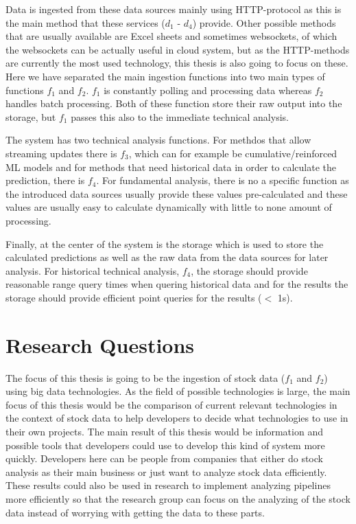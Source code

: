\documentclass[article,11pt]{article}
\begin{document}
Data is ingested from these data sources mainly using HTTP-protocol as this is the main method that these services ($d_1$ - $d_4$) provide.
Other possible methods that are usually available are Excel sheets and sometimes websockets, of which the websockets can be actually useful in cloud system, but as the HTTP-methods are currently the most used technology, this thesis is also going to focus on these.
Here we have separated the main ingestion functions into two main types of functions $f_1$ and $f_2$. 
$f_1$ is constantly polling and processing data whereas $f_2$ handles batch processing.
Both of these function store their raw output into the storage, but $f_1$ passes this also to the immediate technical analysis.

The system has two technical analysis functions.
For methdos that allow streaming updates there is $f_3$, which can for example be cumulative/reinforced ML models and for methods that need historical data in order to calculate the prediction, there is $f_4$.
For fundamental analysis, there is no a specific function as the introduced data sources usually provide these values pre-calculated and these values are usually easy to calculate dynamically with little to none amount of processing.

Finally, at the center of the system is the storage which is used to store the calculated predictions as well as the raw data from the data sources for later analysis.
For historical technical analysis, $f_4$, the storage should provide reasonable range query times when quering historical data and for the results the storage should provide efficient point queries for the results ($<$ 1s).

\section{Research Questions}

The focus of this thesis is going to be the ingestion of stock data ($f_1$ and $f_2$) using big data technologies.
As the field of possible technologies is large, the main focus of this thesis would be the comparison of current relevant technologies in the context of stock data to help developers to decide what technologies to use in their own projects.
The main result of this thesis would be information and possible tools that developers could use to develop this kind of system more quickly.
Developers here can be people from companies that either do stock analysis as their main business or just want to analyze stock data efficiently.
These results could also be used in research to implement analyzing pipelines more efficiently so that the research group can focus on the analyzing of the stock data instead of worrying with getting the data to these parts.
\end{document}
